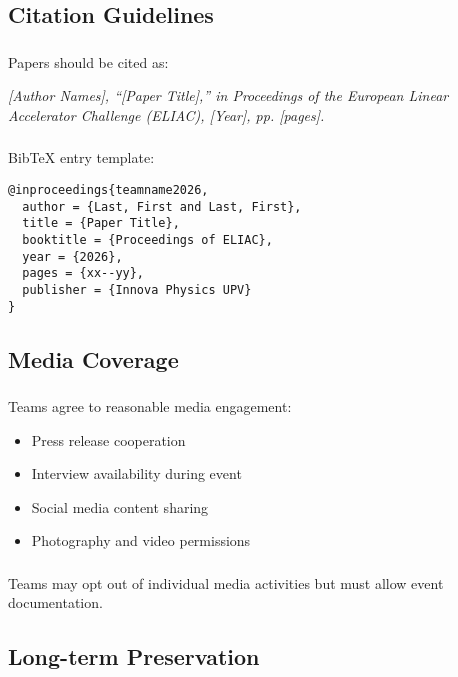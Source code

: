 \subsection{Citation Guidelines}

\subsubsection{}
Papers should be cited as:

\noindent\textit{[Author Names], ``[Paper Title],'' in Proceedings of the European Linear Accelerator Challenge (ELIAC), [Year], pp. [pages].}

\subsubsection{}
BibTeX entry template:
\begin{verbatim}
@inproceedings{teamname2026,
  author = {Last, First and Last, First},
  title = {Paper Title},
  booktitle = {Proceedings of ELIAC},
  year = {2026},
  pages = {xx--yy},
  publisher = {Innova Physics UPV}
}
\end{verbatim}

\subsection{Media Coverage}

\subsubsection{}
Teams agree to reasonable media engagement:
\begin{itemize}[noitemsep]
    \item Press release cooperation
    \item Interview availability during event
    \item Social media content sharing
    \item Photography and video permissions
\end{itemize}

\subsubsection{}
Teams may opt out of individual media activities but must allow event documentation.

\subsection{Long-term Preservation}

